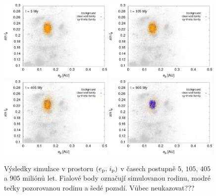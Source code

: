 \documentclass[A4paper, 12pt, oneside]{book}
\begin{document}
\immediate{}
\immediate{}
\immediate{}
\immediate{}
\begin{figure}
	\centering
	\includegraphics[width=0.49\textwidth]{obr/ei_5t.png}
	\includegraphics[width=0.49\textwidth]{obr/ei_105t.png}\\
	\includegraphics[width=0.49\textwidth]{obr/ei_405t.png}
	\includegraphics[width=0.49\textwidth]{obr/ei_905t.png}
	\caption{Výsledky simulace v prostoru $(e_{\rm p},\,i_{\rm p})$ v časech postupně $5$, $105$, $405$ a $905$ miliónů let. Fialové body označují simulovanou rodinu, modré tečky pozorovanou rodinu a šedé pozadí. Vůbec neukazovat???}
\end{figure}
\end{document}
